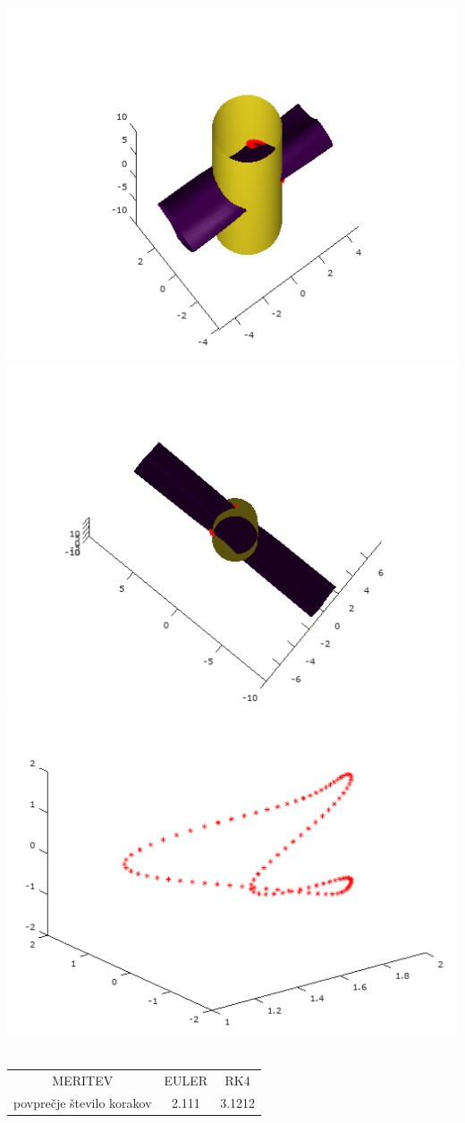 \documentclass[]{article}
\begin{document}
	\includegraphics[scale=0.3]{primer8_2}\\
	\includegraphics[scale=0.3]{primer8_3}
	\includegraphics[scale=0.3]{primer8_4} \\ \\
	\begin{center}
	\begin{tabular}{ |c|c|c| } 
 		\hline
 			MERITEV & EULER & RK4 \\ 
			povpre\v{c}je \v{s}tevilo korakov & 2.111 & 3.1212 \\ 
 		\hline
 	\end{tabular}
	\end{center}
	
\end{document}
